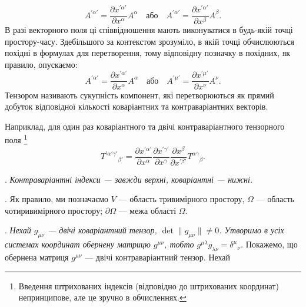 \begin{equation*}
  A^{\prime\alpha'} = \frac{\partial x^{\prime\alpha'}}{\partial x^\alpha} A^\alpha
  \quad\text{або}\quad
  A^{\prime\alpha'} = \frac{\partial x^{\prime\alpha'}}{\partial x^\beta} A^\beta.
\end{equation*}
В разі векторного поля ці співвідношення мають виконуватися в будь-якій точці простору-часу. Здебільшого за контекстом
зрозуміло, в якій точці обчислюються похідні в формулах для перетворення, тому відповідну позначку в похідних, як
правило, опускаємо:
\begin{equation*}
  A^{\prime\alpha'} = \frac{\partial x^{\prime\alpha'}}{\partial x^\alpha} A^\alpha
  \quad\text{або}\quad
  A^{\prime\mu'} = \frac{\partial x^{\prime\mu'}}{\partial x^\nu} A^\nu.
\end{equation*}
Тензором називають сукупність компонент, які перетворюються як прямий добуток відповідної кількості коваріантних та
контраваріантних векторів.

Наприклад, для один раз коваріантного та двічі контраваріантного тензорного поля%
\footnote{Введення штрихованих індексів (відповідно до штрихованих координат) непринципове, але це зручно в
  обчисленнях.}
\begin{equation*}
  T^{\prime\alpha'\gamma'}{}_{\beta'} =
  \frac{\partial x^{\prime\alpha'}}{\partial x^\alpha}
  \frac{\partial x^{\prime\gamma'}}{\partial x^\gamma}
  \frac{\partial x^\beta}{\partial x^{\prime\beta'}}
  T^{\alpha\gamma}{}_\beta.
\end{equation*}

\element.  \textit{Контраваріантні індекси --- завжди верхні, коваріантні --- нижні.}

\element.  Як правило, ми позначаємо $V$ --- область тривимірного простору, $\Omega$ --- область чотиривимірного
простору; $\partial\Omega$ --- межа області $\Omega$.

\element.  \textit{Нехай $g_{\mu\nu}$ --- двічі коваріантний тензор, $\det\|g_{\mu\nu}\| \ne 0$. Утворимо в усіх
  системах координат обернену матрицю $g^{\mu\nu}$, тобто $g^{\mu\lambda}g_{\lambda\nu} = \delta^\mu{}_\nu$.} Покажемо,
  що обернена матриця $g^{\mu\nu}$ --- двічі контраваріантний тензор. Нехай

